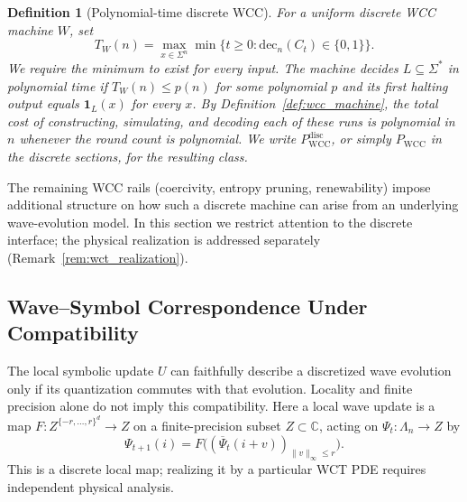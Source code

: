 \documentclass[12pt]{article}
\newtheorem{definition}[theorem]{Definition}
\begin{document}
\begin{definition}[Polynomial-time discrete WCC]
\label{def:pwcc}
For a uniform discrete WCC machine $W$, set
\[
 T_W(n)=\max_{x\in\Sigma^n}\min\{t\ge0:
 \mathrm{dec}_n(C_t)\in\{0,1\}\}.
\]
We require the minimum to exist for every input. The machine decides
$L\subseteq\Sigma^*$ in polynomial time if $T_W(n)\le p(n)$ for
some polynomial $p$ and its first halting output equals
$\mathbf{1}_L(x)$ for every $x$. By Definition~\ref{def:wcc_machine},
the total cost of constructing, simulating, and decoding each of these
runs is polynomial in $n$ whenever the round count is polynomial.
We write $P_{\mathrm{WCC}}^{\mathrm{disc}}$, or simply
$P_{\mathrm{WCC}}$ in the discrete sections, for the resulting class.
\end{definition}



The remaining WCC rails (coercivity, entropy pruning, renewability) impose
additional structure on how such a discrete machine can arise from an underlying
wave-evolution model. In this section we restrict attention to the discrete
interface; the physical realization is addressed separately
(Remark~\ref{rem:wct_realization}).
















\subsection{Wave--Symbol Correspondence Under Compatibility}
\label{subsec:wave-symbol-isomorphism}

The local symbolic update $U$ can faithfully describe a discretized
wave evolution only if its quantization commutes with that evolution.
Locality and finite precision alone do not imply this compatibility.
Here a local wave update is a map
$F:Z^{\{-r,\dots,r\}^d}\to Z$ on a finite-precision
subset $Z\subset\mathbb C$, acting on $\Psi_t:\Lambda_n\to Z$ by
\begin{equation}
\Psi_{t+1}(i)=F\bigl((\overline\Psi_t(i+v))_{\|v\|_\infty\le r}\bigr).
\label{eq:psi-local-update}
\end{equation}
This is a discrete local map; realizing it by a particular WCT PDE
requires independent physical analysis.
\end{document}
